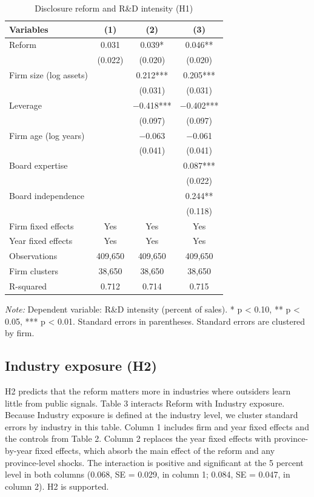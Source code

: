 \documentclass[12pt]{article}
\newcommand{\tabnote}[1]{\par\vspace{2pt}\begin{minipage}{\linewidth}\footnotesize\setstretch{1.0}\textit{Note:} #1\end{minipage}}
\begin{document}
\begin{table}[!htbp]
\centering
\begin{threeparttable}
\caption{Disclosure reform and R\&D intensity (H1)}
\small
{}
\begin{tabular}{lccc}
\toprule
Variables & (1) & (2) & (3) \\
\midrule
Reform & 0.031 & 0.039* & 0.046** \\
 & (0.022) & (0.020) & (0.020) \\
Firm size (log assets) & & 0.212*** & 0.205*** \\
 & & (0.031) & (0.031) \\
Leverage & & $-$0.418*** & $-$0.402*** \\
 & & (0.097) & (0.097) \\
Firm age (log years) & & $-$0.063 & $-$0.061 \\
 & & (0.041) & (0.041) \\
Board expertise & & & 0.087*** \\
 & & & (0.022) \\
Board independence & & & 0.244** \\
 & & & (0.118) \\
\midrule
Firm fixed effects & Yes & Yes & Yes \\
Year fixed effects & Yes & Yes & Yes \\
Observations & 409,650 & 409,650 & 409,650 \\
Firm clusters & 38,650 & 38,650 & 38,650 \\
R-squared & 0.712 & 0.714 & 0.715 \\
\bottomrule
\end{tabular}
\tabnote{Dependent variable: R\&D intensity (percent of sales). * p < 0.10, ** p < 0.05, *** p < 0.01. Standard errors in parentheses. Standard errors are clustered by firm.}
\end{threeparttable}
\end{table}

\subsection{Industry exposure (H2)}

H2 predicts that the reform matters more in industries where outsiders learn little from public signals. Table 3 interacts Reform with Industry exposure. Because Industry exposure is defined at the industry level, we cluster standard errors by industry in this table. Column 1 includes firm and year fixed effects and the controls from Table 2. Column 2 replaces the year fixed effects with province-by-year fixed effects, which absorb the main effect of the reform and any province-level shocks. The interaction is positive and significant at the 5 percent level in both columns (0.068, SE = 0.029, in column 1; 0.084, SE = 0.047, in column 2). H2 is supported.
\end{document}
